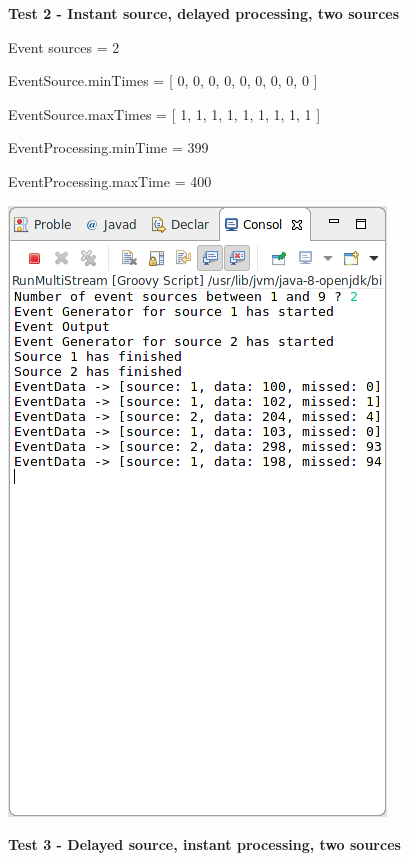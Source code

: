 \textbf{Test 2 - Instant source, delayed processing, two sources}

Event sources = 2

EventSource.minTimes = [ 0, 0, 0, 0, 0, 0, 0, 0, 0 ]

EventSource.maxTimes = [ 1, 1, 1, 1, 1, 1, 1, 1, 1 ]

EventProcessing.minTime = 399

EventProcessing.maxTime = 400

\includegraphics[width=\textwidth/2]{img/screenshots/9-2-2.png}

\textbf{Test 3 - Delayed source, instant processing, two sources}

